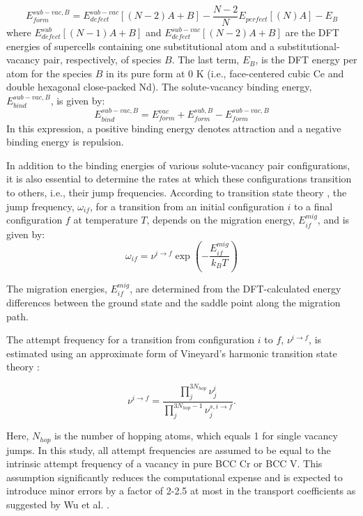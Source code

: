 \documentclass[preprint,12pt]{elsarticle}
\begin{document}
\begin{equation}
\label{eq_Ef_vac_sub}
    E_{form}^{sub-vac,B} = E_{defect}^{sub-vac}[(N-2)A + B] - \frac{N-2}{N}E_{perfect}[(N) A] - E_{B}
\end{equation}
where $E_{defect}^{sub}[(N-1)A + B]$ and $E_{defect}^{sub-vac}[(N-2)A + B]$ are the DFT energies of supercells containing one substitutional atom and a substitutional-vacancy pair, respectively, of species $B$. The last term, $E_{B}$, is the DFT energy per atom for the species $B$ in its pure form at 0 K (i.e., face-centered cubic Ce and double hexagonal close-packed Nd). The solute-vacancy binding energy, $E_{bind}^{sub-vac,B}$, is given by:
\begin{equation}
\label{eq_Eb}
    E_{bind}^{sub-vac,B} = E_{form}^{vac} + E_{form}^{sub,B} - E_{form}^{sub-vac,B}
\end{equation}
In this expression, a positive binding energy denotes attraction and a negative binding energy is repulsion. 

In addition to the binding energies of various solute-vacancy pair configurations, it is also essential to determine the rates at which these configurations transition to others, i.e., their jump frequencies. According to transition state theory \cite{vineyard_frequency_1957}, the jump frequency, $\omega_{if}$, for a transition from an initial configuration $i$ to a final configuration $f$ at temperature $T$, depends on the migration energy, $E_{if}^{mig}$, and is given by:
\begin{equation}
\omega_{if} = \nu^{i\rightarrow f} \exp\left(-\frac{E_{if}^{mig}}{k_BT}\right)
\end{equation}

\noindent The migration energies, $E_{if}^{mig}$, are determined from the DFT-calculated energy differences between the ground state and the saddle point along the migration path. 

The attempt frequency for a transition from configuration $i$ to $f$, $\nu^{i\rightarrow f}$, is estimated using an approximate form of Vineyard's harmonic transition state theory \cite{vineyard_frequency_1957}:

\begin{equation} \nu^{i\rightarrow f} = \frac{\prod_{j}^{3N_{hop}} \nu^{i}_{j}}{\prod_{j}^{3N_{hop}-1} \nu^{s,i\rightarrow f}_j}. \end{equation}

\noindent Here, $N_{hop}$ is the number of hopping atoms, which equals 1 for single vacancy jumps. In this study, all attempt frequencies are assumed to be equal to the intrinsic attempt frequency of a vacancy in pure BCC Cr or BCC V. This assumption significantly reduces the computational expense and is expected to introduce minor errors by a factor of 2-2.5 at most in the transport coefficients as suggested by Wu et al. \cite{wu_high-throughput_2016}.
\end{document}
